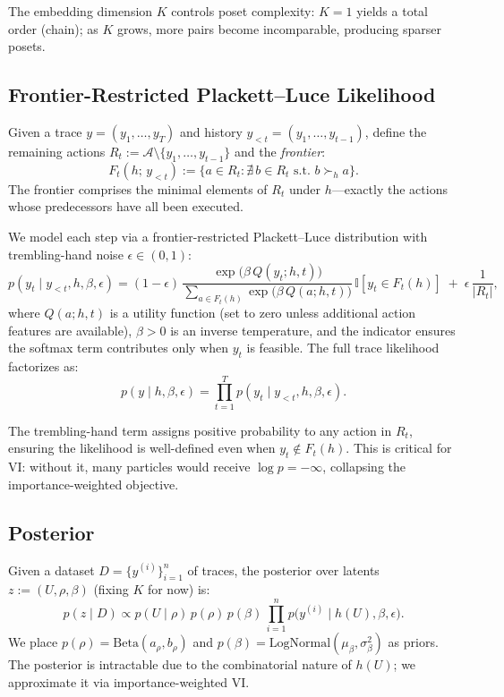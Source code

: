 \documentclass{article}
\theoremstyle{definition}
\theoremstyle{remark}
\newcommand{\indic}{\mathbb{I}}
\providecommand{\coloneqq}{:=}
\begin{document}
The embedding dimension $K$ controls poset complexity: $K=1$ yields a
total order (chain); as $K$ grows, more pairs become incomparable,
producing sparser posets.

\subsection{Frontier-Restricted Plackett--Luce Likelihood}
\label{sec:likelihood}
Given a trace $y=(y_1,\dots,y_T)$ and history $y_{<t}=(y_1,\dots,y_{t-1})$,
define the remaining actions $R_t\coloneqq\mathcal{A}\setminus\{y_1,\dots,y_{t-1}\}$
and the \emph{frontier}:
\begin{equation}
F_t(h;\,y_{<t})
\coloneqq \bigl\{a\in R_t : \nexists\, b\in R_t\text{ s.t.\ }
b\succ_h a\bigr\}.
\label{eq:frontier}
\end{equation}
The frontier comprises the minimal elements of $R_t$ under $h$---exactly
the actions whose predecessors have all been executed.

We model each step via a frontier-restricted Plackett--Luce distribution
with trembling-hand noise $\epsilon\in(0,1)$:
\begin{equation}
p(y_t\mid y_{<t},h,\beta,\epsilon)
= (1-\epsilon)\,
\frac{\exp\bigl(\beta\, Q(y_t;h,t)\bigr)}
     {\sum_{a\in F_t(h)}\exp\bigl(\beta\, Q(a;h,t)\bigr)}\,
     \indic[y_t\in F_t(h)]
\;+\;
\epsilon\,\frac{1}{|R_t|},
\label{eq:step_likelihood}
\end{equation}
where $Q(a;h,t)$ is a utility function (set to zero unless additional
action features are available), $\beta>0$ is an inverse temperature, and
the indicator ensures the softmax term contributes only when $y_t$ is
feasible.  The full trace likelihood factorizes as:
\begin{equation}
p(y\mid h,\beta,\epsilon) = \prod_{t=1}^T p(y_t\mid y_{<t},h,\beta,\epsilon).
\label{eq:trace_ll}
\end{equation}

The trembling-hand term assigns positive probability to any action in
$R_t$, ensuring the likelihood is well-defined even when $y_t\notin F_t(h)$.
This is critical for VI: without it, many particles would receive
$\log p=-\infty$, collapsing the importance-weighted objective.

\subsection{Posterior}
\label{sec:posterior}
Given a dataset $D=\{y^{(i)}\}_{i=1}^n$ of traces, the posterior over
latents $z\coloneqq(U,\rho,\beta)$ (fixing $K$ for now) is:
\begin{equation}
p(z\mid D)
\propto p(U\mid\rho)\,p(\rho)\,p(\beta)\,
\prod_{i=1}^n p\bigl(y^{(i)}\mid h(U),\beta,\epsilon\bigr).
\label{eq:posterior}
\end{equation}
We place $p(\rho)=\mathrm{Beta}(a_\rho,b_\rho)$ and
$p(\beta)=\mathrm{LogNormal}(\mu_\beta,\sigma_\beta^2)$ as priors.
The posterior is intractable due to the combinatorial nature of $h(U)$;
we approximate it via importance-weighted VI.
\end{document}
